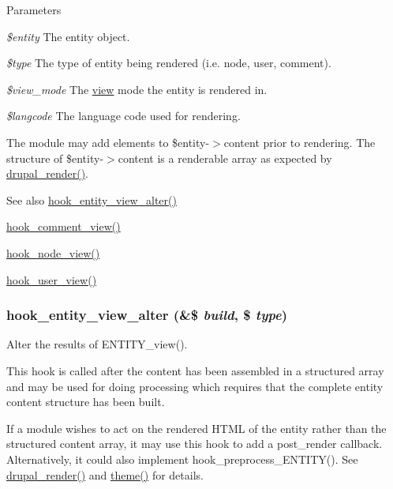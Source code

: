 \begin{DoxyParams}{Parameters}
\item[{\em \$entity}]The entity object. \item[{\em \$type}]The type of entity being rendered (i.e. node, user, comment). \item[{\em \$view\_\-mode}]The \hyperlink{classview}{view} mode the entity is rendered in. \item[{\em \$langcode}]The language code used for rendering.\end{DoxyParams}
The module may add elements to \$entity-\/$>$content prior to rendering. The structure of \$entity-\/$>$content is a renderable array as expected by \hyperlink{common_8inc_a05798b44e8d6c496d4bee5cc32fa7851}{drupal\_\-render()}.

\begin{DoxySeeAlso}{See also}
\hyperlink{group__hooks_ga2c2be6c70815b426f0eb13b0b68edb40}{hook\_\-entity\_\-view\_\-alter()} 

\hyperlink{group__hooks_gab162cbd3dc1b0395011df47ca3f98aa3}{hook\_\-comment\_\-view()} 

\hyperlink{group__node__api__hooks_ga475290ee8e81a2373ea17c512cc3f9a9}{hook\_\-node\_\-view()} 

\hyperlink{group__hooks_gaafb9e35d1f82a33918437ad7acf29541}{hook\_\-user\_\-view()} 
\end{DoxySeeAlso}
\hypertarget{group__hooks_ga2c2be6c70815b426f0eb13b0b68edb40}{
\subsubsection[{hook\_\-entity\_\-view\_\-alter}]{\setlength{\rightskip}{0pt plus 5cm}hook\_\-entity\_\-view\_\-alter (\&\$ {\em build}, \/  \$ {\em type})}}
\label{group__hooks_ga2c2be6c70815b426f0eb13b0b68edb40}
Alter the results of ENTITY\_\-view().

This hook is called after the content has been assembled in a structured array and may be used for doing processing which requires that the complete entity content structure has been built.

If a module wishes to act on the rendered HTML of the entity rather than the structured content array, it may use this hook to add a post\_\-render callback. Alternatively, it could also implement hook\_\-preprocess\_\-ENTITY(). See \hyperlink{common_8inc_a05798b44e8d6c496d4bee5cc32fa7851}{drupal\_\-render()} and \hyperlink{includes_2theme_8inc_a7c25609a935874541a19657affd30fff}{theme()} for details.


